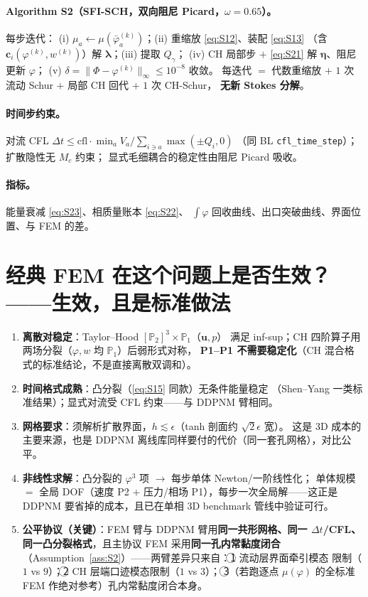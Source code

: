 \documentclass[11pt]{article}
\theoremstyle{definition}
\theoremstyle{plain}
\theoremstyle{remark}
\newcommand{\vel}{\bm{u}}
\newcommand{\iface}{\gamma}
\newcommand{\code}[1]{\texttt{#1}}
\begin{document}
\paragraph{Algorithm S2（SFI-SCH，双向阻尼 Picard，$\omega=0.65$）。}每步迭代：
(i) $\mu_a\leftarrow\mu(\bar\varphi_a^{(k)})$；(ii) 重缩放 \eqref{eq:S12}、装配 \eqref{eq:S13}
（含 $\bm c_i(\varphi^{(k)},w^{(k)})$）解 $\bm\lambda$；(iii) 提取 $Q_\iface$；
(iv) CH 局部步 $+$ \eqref{eq:S21} 解 $\bm\eta$、阻尼更新 $\varphi$；
(v) $\delta=\|\Phi-\varphi^{(k)}\|_\infty\le10^{-8}$ 收敛。
每迭代 $=$ 代数重缩放 $+$ $1$ 次流动 Schur $+$ 局部 CH 回代 $+$ $1$ 次 CH-Schur，
\textbf{无新 Stokes 分解}。

\paragraph{时间步约束。}对流 CFL
$\Delta t\le\mathrm{cfl}\cdot\min_aV_a/\sum_{i\ni a}\max(\pm Q_i,0)$
（同 BL \code{cfl\_time\_step}）；扩散隐性无 $M_c$ 约束；
显式毛细耦合的稳定性由阻尼 Picard 吸收。

\paragraph{指标。}能量衰减 \eqref{eq:S23}、相质量账本 \eqref{eq:S22}、
$\int\varphi$ 回收曲线、出口突破曲线、界面位置、与 FEM 的差。

\section{经典 FEM 在这个问题上是否生效？——生效，且是标准做法}

\begin{enumerate}
\item \textbf{离散对稳定}：Taylor--Hood $[\mathbb P_2]^3\times\mathbb P_1$（$\vel,p$）
满足 inf-sup；CH 四阶算子用两场分裂（$\varphi,w$ 均 $\mathbb P_1$）后弱形式对称，
\textbf{P1--P1 不需要稳定化}（CH 混合格式的标准结论，不是直接离散双调和）。
\item \textbf{时间格式成熟}：凸分裂（\eqref{eq:S15} 同款）无条件能量稳定
（Shen--Yang 一类标准结果）；显式对流受 CFL 约束——与 DDPNM 臂相同。
\item \textbf{网格要求}：须解析扩散界面，$h\lesssim\epsilon$（tanh 剖面约 $\sqrt2\epsilon$ 宽）。
这是 3D 成本的主要来源，也是 DDPNM 离线库同样要付的代价（同一套孔网格），对比公平。
\item \textbf{非线性求解}：凸分裂的 $\varphi^3$ 项 $\to$ 每步单体 Newton/一阶线性化；
单体规模 $=$ 全局 DOF（速度 P2 $+$ 压力/相场 P1），每步一次全局解——这正是 DDPNM
要省掉的成本，且已在单相 3D benchmark 管线中验证可行。
\item \textbf{公平协议（关键）}：FEM 臂与 DDPNM 臂用\textbf{同一共形网格、同一
$\Delta t$/CFL、同一凸分裂格式}，且主协议 FEM 采用\textbf{同一孔内常黏度闭合}
（Assumption~\ref{ass:S2}）——两臂差异只来自：\textcircled{1} 流动层界面牵引模态
限制（$1$ vs $9$）；\textcircled{2} CH 层端口迹模态限制（$1$ vs $3$）；
\textcircled{3}（若跑逐点 $\mu(\varphi)$ 的全标准 FEM 作绝对参考）孔内常黏度闭合本身。
\end{enumerate}
\end{document}
